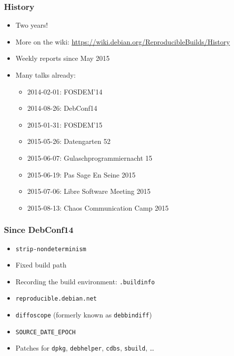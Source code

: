 \documentclass[14pt,aspectratio=169]{beamer}
\begin{document}
\begin{frame}
 \frametitle{History}

 \begin{itemize}
  \item Two years!
  \item More on the wiki:
    {\small \url{https://wiki.debian.org/ReproducibleBuilds/History}}
  \item Weekly reports since May 2015
  \item Many talks already:
   \begin{itemize}
    \item 2014-02-01: FOSDEM’14
    \item 2014-08-26: DebConf14
    \item 2015-01-31: FOSDEM’15
    \item 2015-05-26: Datengarten 52
    \item 2015-06-07: Gulaschprogrammiernacht 15
    \item 2015-06-19: Pas Sage En Seine 2015
    \item 2015-07-06: Libre Software Meeting 2015
    \item 2015-08-13: Chaos Communication Camp 2015
   \end{itemize}
 \end{itemize}
\end{frame}

\begin{frame}
 \frametitle{Since DebConf14}

 \begin{itemize}
  \item \texttt{strip-nondeterminism}
  \item Fixed build path
  \item Recording the build environment: \texttt{.buildinfo}
  \item \texttt{reproducible.debian.net}
  \item \texttt{diffoscope} (formerly known as \texttt{debbindiff})
  \item \texttt{SOURCE\_DATE\_EPOCH}
  \item Patches for \texttt{dpkg}, \texttt{debhelper}, \texttt{cdbs}, \texttt{sbuild}, …
 \end{itemize}
\end{frame}
\end{document}

